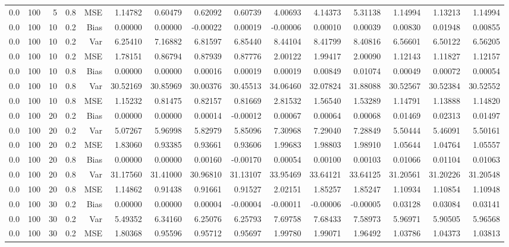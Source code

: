 \begin{table}[!htbp]
\begin{tabular}{lrrrrrrrrrrrrrr}
0.0 & 100 &  5 & 0.8 & MSE & 1.14782 & 0.60479 & 0.62092 & 0.60739 & 4.00693 & 4.14373 & 5.31138 & 1.14994 & 1.13213 & 1.14994 \\
0.0 & 100 & 10 & 0.2 & Bias & 0.00000 & 0.00000 & -0.00022 & 0.00019 & -0.00006 & 0.00010 & 0.00039 & 0.00830 & 0.01948 & 0.00855 \\
0.0 & 100 & 10 & 0.2 & Var & 6.25410 & 7.16882 & 6.81597 & 6.85440 & 8.44104 & 8.41799 & 8.40816 & 6.56601 & 6.50122 & 6.56205 \\
0.0 & 100 & 10 & 0.2 & MSE & 1.78151 & 0.86794 & 0.87939 & 0.87776 & 2.00122 & 1.99417 & 2.00090 & 1.12143 & 1.11827 & 1.12157 \\
0.0 & 100 & 10 & 0.8 & Bias & 0.00000 & 0.00000 & 0.00016 & 0.00019 & 0.00019 & 0.00849 & 0.01074 & 0.00049 & 0.00072 & 0.00054 \\
0.0 & 100 & 10 & 0.8 & Var & 30.52169 & 30.85969 & 30.00376 & 30.45513 & 34.06460 & 32.07824 & 31.88088 & 30.52567 & 30.52384 & 30.52552 \\
0.0 & 100 & 10 & 0.8 & MSE & 1.15232 & 0.81475 & 0.82157 & 0.81669 & 2.81532 & 1.56540 & 1.53289 & 1.14791 & 1.13888 & 1.14820 \\
0.0 & 100 & 20 & 0.2 & Bias & 0.00000 & 0.00000 & 0.00014 & -0.00012 & 0.00067 & 0.00064 & 0.00068 & 0.01469 & 0.02313 & 0.01497 \\
0.0 & 100 & 20 & 0.2 & Var & 5.07267 & 5.96998 & 5.82979 & 5.85096 & 7.30968 & 7.29040 & 7.28849 & 5.50444 & 5.46091 & 5.50161 \\
0.0 & 100 & 20 & 0.2 & MSE & 1.83060 & 0.93385 & 0.93661 & 0.93606 & 1.99683 & 1.98803 & 1.98910 & 1.05644 & 1.04764 & 1.05557 \\
0.0 & 100 & 20 & 0.8 & Bias & 0.00000 & 0.00000 & 0.00160 & -0.00170 & 0.00054 & 0.00100 & 0.00103 & 0.01066 & 0.01104 & 0.01063 \\
0.0 & 100 & 20 & 0.8 & Var & 31.17560 & 31.41000 & 30.96810 & 31.13107 & 33.95469 & 33.64121 & 33.64125 & 31.20561 & 31.20226 & 31.20548 \\
0.0 & 100 & 20 & 0.8 & MSE & 1.14862 & 0.91438 & 0.91661 & 0.91527 & 2.02151 & 1.85257 & 1.85247 & 1.10934 & 1.10854 & 1.10948 \\
0.0 & 100 & 30 & 0.2 & Bias & 0.00000 & 0.00000 & 0.00004 & -0.00004 & -0.00011 & -0.00006 & -0.00005 & 0.03128 & 0.03084 & 0.03141 \\
0.0 & 100 & 30 & 0.2 & Var & 5.49352 & 6.34160 & 6.25076 & 6.25793 & 7.69758 & 7.68433 & 7.58973 & 5.96971 & 5.90505 & 5.96568 \\
0.0 & 100 & 30 & 0.2 & MSE & 1.80368 & 0.95596 & 0.95712 & 0.95697 & 1.99780 & 1.99071 & 1.96492 & 1.03786 & 1.04373 & 1.03813 \\

\end{tabular}
\end{table}
